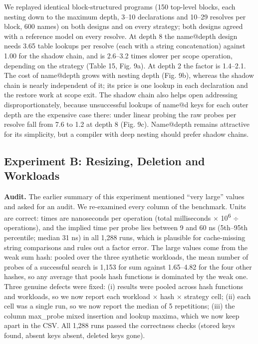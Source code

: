\documentclass{ieeeaccess}
\begin{document}
We replayed identical block-structured programs (150 top-level blocks, each nesting down to the maximum depth, 3--10 declarations and 10--29 resolves per block, 600 names) on both designs and on every strategy; both designs agreed with a reference model on every resolve. At depth 8 the name@depth design needs 3.65 table lookups per resolve (each with a string concatenation) against 1.00 for the shadow chain, and is 2.6--3.2 times slower per scope operation, depending on the strategy (Table 15, Fig. 9a). At depth 2 the factor is 1.4--2.1. The cost of name@depth grows with nesting depth (Fig. 9b), whereas the shadow chain is nearly independent of it; its price is one lookup in each declaration and the restore work at scope exit. The shadow chain also helps open addressing disproportionately, because unsuccessful lookups of name@d keys for each outer depth are the expensive case there: under linear probing the raw probes per resolve fall from 7.6 to 1.2 at depth 8 (Fig. 9c). Name@depth remains attractive for its simplicity, but a compiler with deep nesting should prefer shadow chains.

\subsection{Experiment B: Resizing, Deletion and Workloads}

\textbf{Audit.} The earlier summary of this experiment mentioned ``very large'' values and asked for an audit. We re-examined every column of the benchmark. Units are correct: times are nanoseconds per operation (total milliseconds $\times$ 10\textsuperscript{6} $\div$ operations), and the implied time per probe lies between 9 and 60 ns (5th--95th percentile; median 31 ns) in all 1,288 runs, which is plausible for cache-missing string comparisons and rules out a factor error. The large values come from the weak sum hash: pooled over the three synthetic workloads, the mean number of probes of a successful search is 1,153 for sum against 1.65--4.82 for the four other hashes, so any average that pools hash functions is dominated by the weak one. Three genuine defects were fixed: (i) results were pooled across hash functions and workloads, so we now report each workload $\times$ hash $\times$ strategy cell; (ii) each cell was a single run, so we now report the median of 5 repetitions; (iii) the column max\_probe mixed insertion and lookup maxima, which we now keep apart in the CSV. All 1,288 runs passed the correctness checks (stored keys found, absent keys absent, deleted keys gone).
\end{document}
